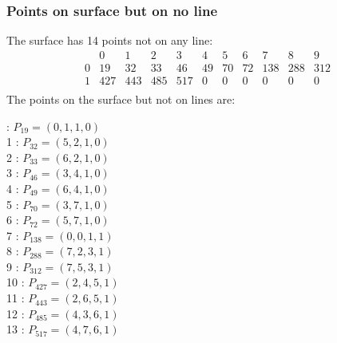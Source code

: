 \documentclass{article}
\begin{document}
{\subsubsection*{Points on surface but on no line}
The surface has 14 points not on any line:\\
$$
\begin{array}{r|*{10}{r}}
 & 0 & 1 & 2 & 3 & 4 & 5 & 6 & 7 & 8 & 9\\
\hline
0 & 19 & 32 & 33 & 46 & 49 & 70 & 72 & 138 & 288 & 312\\
1 & 427 & 443 & 485 & 517 & 0 & 0 & 0 & 0 & 0 & 0\\
\end{array}
$$
The points on the surface but not on lines are:\\
\begin{multicols}{2}
 : $P_{19}=( 0, 1, 1, 0 )$\\
1 : $P_{32}=( 5, 2, 1, 0 )$\\
2 : $P_{33}=( 6, 2, 1, 0 )$\\
3 : $P_{46}=( 3, 4, 1, 0 )$\\
4 : $P_{49}=( 6, 4, 1, 0 )$\\
5 : $P_{70}=( 3, 7, 1, 0 )$\\
6 : $P_{72}=( 5, 7, 1, 0 )$\\
7 : $P_{138}=( 0, 0, 1, 1 )$\\
8 : $P_{288}=( 7, 2, 3, 1 )$\\
9 : $P_{312}=( 7, 5, 3, 1 )$\\
10 : $P_{427}=( 2, 4, 5, 1 )$\\
11 : $P_{443}=( 2, 6, 5, 1 )$\\
12 : $P_{485}=( 4, 3, 6, 1 )$\\
13 : $P_{517}=( 4, 7, 6, 1 )$\\
\end{multicols}
}
\end{document}
